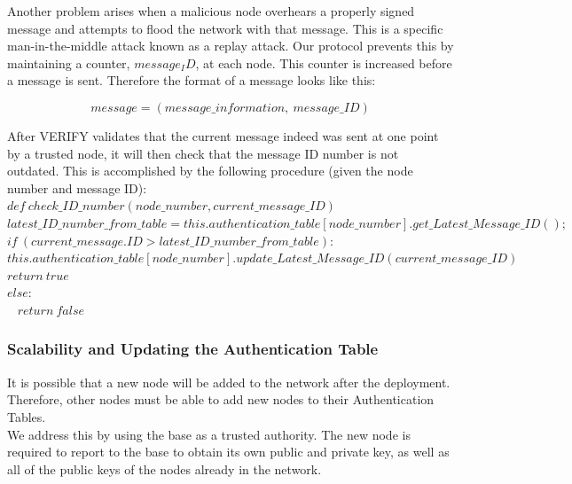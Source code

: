 \documentclass[letterpaper]{article}
\begin{document}
Another problem arises when a malicious node overhears a properly signed message and attempts to flood the network  with that message. This is a specific man-in-the-middle attack known as a replay attack. Our protocol prevents this by maintaining a counter, $message_ID$, at each node. This counter is increased before a message is sent. Therefore the format of a message looks like this:

$$message = (message\_information, \ message\_ID)$$

\noindent After \textsc{VERIFY} validates that the current message indeed was sent at one point by a trusted node, 
it will then check that the message ID number is not outdated. This is accomplished by the following procedure 
(given the node number and message ID):
\\

$def \ check\_ID\_number(node\_number, current\_message\_ID)$ \\
\hspace*{10 mm} $latest\_ID\_number\_from\_table = this.authentication\_table[node\_number].get\_Latest\_Message\_ID();$
\hspace*{10 mm} $if \ (current\_message.ID > latest\_ID\_number\_from\_table):$\\
\hspace*{20 mm} $this.authentication\_table[node\_number].update\_Latest\_Message\_ID(current\_message\_ID)$\\
\hspace*{20 mm} $return \ true$ \\
\hspace*{10 mm} $else:$\\ \ 
\hspace*{20 mm} $return \ false$\\


\subsubsection{Scalability and Updating the Authentication Table}

It is possible that a new node will be added to the network after the deployment. 
Therefore, other nodes must be able to add new nodes to their Authentication Tables.
\\

\noindent We address this by using the base as a trusted authority. The new node is required to report to the base
to obtain its own public and private key, as well as all of the public keys of the nodes already in the network.
\\
\end{document}
